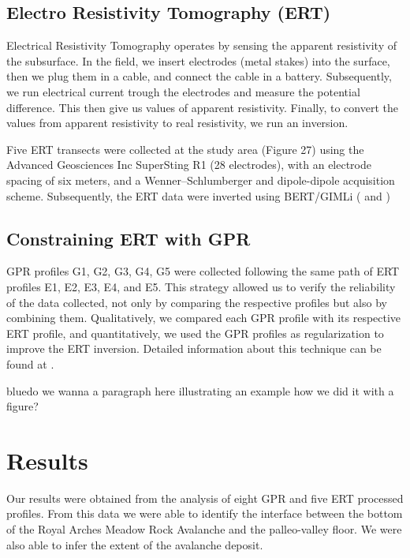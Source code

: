 \documentclass[5p]{elsarticle}
\newcommand{\COMON}{\begin{color}{blue}}
\newcommand{\COMOFF}{\end{color}}
\begin{document}
												
												
		\subsection{Electro Resistivity Tomography (ERT)}

Electrical Resistivity Tomography operates by sensing the apparent resistivity of the subsurface. In the field, we insert electrodes (metal stakes) into the surface, then we plug them in a cable, and connect the cable in a battery. Subsequently, we run electrical current trough the electrodes and measure the potential difference. This then give us values of apparent resistivity. Finally, to convert the values from apparent resistivity to real resistivity, we run an inversion.

Five ERT transects were collected at the study area (Figure 27) using the Advanced Geosciences Inc SuperSting R1 (28 electrodes), with an electrode spacing of six meters, and a Wenner–Schlumberger and dipole-dipole acquisition scheme. Subsequently, the ERT data were inverted using BERT/GIMLi (\cite{gunther2013boundless} and \cite{gunther2006three})

	
	\subsection{Constraining ERT with GPR}
										
GPR profiles G1, G2, G3, G4, G5 were collected following the same path of ERT profiles E1, E2, E3, E4, and E5. This strategy allowed us to verify the reliability of the data collected, not only by comparing the respective profiles but also by combining them. Qualitatively, we compared each GPR profile with its respective ERT profile, and quantitatively, we used the GPR profiles as regularization to improve the ERT inversion. Detailed information about this technique can be found at \cite{doetsch2012constraining}.

\COMON do we wanna a paragraph here illustrating an example how we did it with a figure?\COMOFF
									
									
									
									
									
\section{Results}
										
Our results were obtained from the analysis of eight GPR and five ERT processed profiles. From this data we were able to identify the interface between the bottom of the Royal Arches Meadow Rock Avalanche and the palleo-valley floor. We were also able to infer the extent of the avalanche deposit.  
\end{document}

